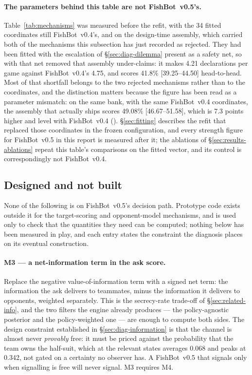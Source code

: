 \documentclass[11pt]{article}
\theoremstyle{definition}
\DeclareRobustCommand{\vfive}{\texorpdfstring{\mbox{FishBot v0.5}}{FishBot v0.5}}
\DeclareRobustCommand{\vfour}{\texorpdfstring{\mbox{FishBot v0.4}}{FishBot v0.4}}
\providecommand{\numOwnProbMean}{0.068}
\providecommand{\numOwnProbMax}{0.342}
\providecommand{\numVfourParamWin}{41.8}
\providecommand{\numVfourParamCI}{39.25--44.50}
\providecommand{\numVfourParamDecl}{4.21}
\providecommand{\numVfourDecl}{4.75}
\providecommand{\numShipParamSameBank}{49.08}
\providecommand{\numShipParamSameCI}{46.67--51.58}
\providecommand{\numRejectedCost}{7.3}
\providecommand{\numFitDims}{34}
\begin{document}
\paragraph{The parameters behind this table are not \vfive{}'s.}
Table~\ref{tab:mechanisms} was measured before the refit, with the
\numFitDims{} fitted coordinates still \vfour{}'s, and on the design-time
assembly, which carried both of the mechanisms this subsection has just recorded
as rejected. They had been fitted with the escalation of
\S\ref{sec:diag-dilemma} present as a safety net, so with that net removed that
assembly under-claims: it makes \numVfourParamDecl{}
declarations per game against \vfour{}'s \numVfourDecl{}, and scores
\numVfourParamWin\% [\numVfourParamCI] head-to-head. Most of that shortfall
belongs to the two rejected mechanisms rather than to the coordinates, and the
distinction matters because the figure has been read as a parameter mismatch:
on the same bank, with the same \vfour{} coordinates, the assembly that actually
ships scores \numShipParamSameBank\% [\numShipParamSameCI], which is
\numRejectedCost{} points higher and level with \vfour{}
().
\S\ref{sec:fitting} describes the refit that replaced those
coordinates in the frozen configuration, and every strength figure for \vfive{}
in this report is measured after it; the ablations of
\S\ref{sec:results-ablations} repeat this table's comparisons on the fitted
vector, and its control is correspondingly not \vfour{}.

\subsection{Designed and not built}
\label{sec:mech-designed}

None of the following is on \vfive{}'s decision path. Prototype code exists
outside it for the target-scoring and opponent-model mechanisms, and is used only
to check that the quantities they need can be computed; nothing below has been
measured in play, and each entry states the constraint the diagnosis places on
its eventual construction.

\paragraph{M3 --- a net-information term in the ask score.} Replace the negative
value-of-information term with a signed net term: the information the ask
delivers to teammates, minus the information it delivers to opponents, weighted
separately. This is the secrecy-rate trade-off of \S\ref{sec:related-info}, and
the two filters the engine already produces --- the policy-agnostic posterior and
the policy-weighted one --- are enough to compute both sides. The design
constraint established in \S\ref{sec:diag-information} is that the channel is
almost never \emph{provably} free: it must be priced against the probability that
the team owns the half-suit, which at the relevant states averages
\numOwnProbMean{} and peaks at \numOwnProbMax{}, not
gated on a certainty no observer has. A \vfive{} that signals only when signalling
is free will never signal. M3 requires M4.
\end{document}
